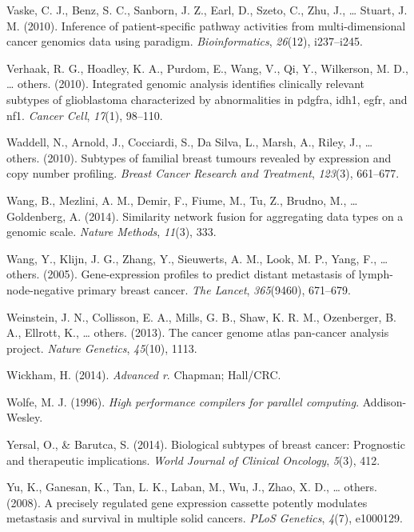 \documentclass[12pt,twoside]{reedthesis}
\begin{document}
\leavevmode\hypertarget{ref-vaske2010inference}{}%
Vaske, C. J., Benz, S. C., Sanborn, J. Z., Earl, D., Szeto, C., Zhu, J., \ldots{} Stuart, J. M. (2010). Inference of patient-specific pathway activities from multi-dimensional cancer genomics data using paradigm. \emph{Bioinformatics}, \emph{26}(12), i237--i245.

\leavevmode\hypertarget{ref-verhaak2010integrated}{}%
Verhaak, R. G., Hoadley, K. A., Purdom, E., Wang, V., Qi, Y., Wilkerson, M. D., \ldots{} others. (2010). Integrated genomic analysis identifies clinically relevant subtypes of glioblastoma characterized by abnormalities in pdgfra, idh1, egfr, and nf1. \emph{Cancer Cell}, \emph{17}(1), 98--110.

\leavevmode\hypertarget{ref-waddell2010subtypes}{}%
Waddell, N., Arnold, J., Cocciardi, S., Da Silva, L., Marsh, A., Riley, J., \ldots{} others. (2010). Subtypes of familial breast tumours revealed by expression and copy number profiling. \emph{Breast Cancer Research and Treatment}, \emph{123}(3), 661--677.

\leavevmode\hypertarget{ref-wang2014similarity}{}%
Wang, B., Mezlini, A. M., Demir, F., Fiume, M., Tu, Z., Brudno, M., \ldots{} Goldenberg, A. (2014). Similarity network fusion for aggregating data types on a genomic scale. \emph{Nature Methods}, \emph{11}(3), 333.

\leavevmode\hypertarget{ref-wang2005gene}{}%
Wang, Y., Klijn, J. G., Zhang, Y., Sieuwerts, A. M., Look, M. P., Yang, F., \ldots{} others. (2005). Gene-expression profiles to predict distant metastasis of lymph-node-negative primary breast cancer. \emph{The Lancet}, \emph{365}(9460), 671--679.

\leavevmode\hypertarget{ref-weinstein2013cancer}{}%
Weinstein, J. N., Collisson, E. A., Mills, G. B., Shaw, K. R. M., Ozenberger, B. A., Ellrott, K., \ldots{} others. (2013). The cancer genome atlas pan-cancer analysis project. \emph{Nature Genetics}, \emph{45}(10), 1113.

\leavevmode\hypertarget{ref-wickham2014advanced}{}%
Wickham, H. (2014). \emph{Advanced r}. Chapman; Hall/CRC.

\leavevmode\hypertarget{ref-wolfe1996high}{}%
Wolfe, M. J. (1996). \emph{High performance compilers for parallel computing}. Addison-Wesley.

\leavevmode\hypertarget{ref-yersal2014biological}{}%
Yersal, O., \& Barutca, S. (2014). Biological subtypes of breast cancer: Prognostic and therapeutic implications. \emph{World Journal of Clinical Oncology}, \emph{5}(3), 412.

\leavevmode\hypertarget{ref-yu2008precisely}{}%
Yu, K., Ganesan, K., Tan, L. K., Laban, M., Wu, J., Zhao, X. D., \ldots{} others. (2008). A precisely regulated gene expression cassette potently modulates metastasis and survival in multiple solid cancers. \emph{PLoS Genetics}, \emph{4}(7), e1000129.


\end{document}
